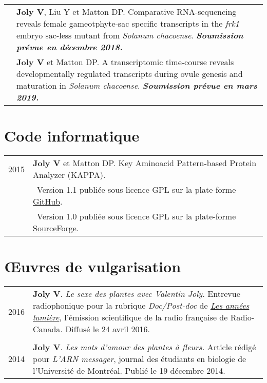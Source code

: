 \documentclass[letterpaper,12pt]{article}
\begin{document}
\begin{tabularx}{\textwidth}{@{}r|X@{}}
& \textbf{Joly V}, Liu Y et Matton DP.
  Comparative RNA-sequencing reveals female gameotphyte-sac specific transcripts in the \emph{frk1} embryo sac-less mutant from \emph{Solanum chacoense}. {\bfseries\em Soumission prévue en décembre 2018.} \vspace{3mm} \\

& \textbf{Joly V} et Matton DP.
  A transcriptomic time-course reveals developmentally regulated transcripts during ovule genesis and maturation in \emph{Solanum chacoense}. {\bfseries\em Soumission prévue en mars 2019.} \\
\end{tabularx}

\vspace{6mm}

\section[Code informatique]{Code informatique}

\begin{tabularx}{\textwidth}{@{}r|X@{}}

2015 & \textbf{Joly V} et Matton DP. Key Aminoacid Pattern-based Protein Analyzer (KAPPA). \\
& \small \hspace{1.5mm} \textbullet{}~Version 1.1 publiée sous licence GPL sur la plate-forme \href{https://github.com/valentinjoly/kappa-1.1}{GitHub}. \\
& \small \hspace{1.5mm} \textbullet{}~Version 1.0 publiée sous licence GPL sur la plate-forme \href{https://sourceforge.net/projects/kappa-sequence-search/}{SourceForge}. \\

\end{tabularx}

\vspace{6mm}

\section[Vulgarisation]{Œuvres de vulgarisation}

\begin{tabularx}{\textwidth}{@{}r|X@{}}

2016 & \textbf{Joly V}. {\em Le sexe des plantes avec Valentin Joly.} Entrevue radiophonique pour la rubrique {\em Doc/Post-doc} de \href{http://ici.radio-canada.ca/emissions/les_annees_lumiere/2015-2016/chronique.asp?idChronique=404672}{\em Les années lumière}, l’émission scientifique de la radio française de Radio-Canada. Diffusé le 24 avril 2016. \\

\multicolumn{2}{c}{} \\

2014 & \textbf{Joly V}. {\em Les mots d’amour des plantes à fleurs.} Article rédigé pour {\em L’ARN messager}, journal des étudiants en biologie de l’Université de Montréal. Publié le 19 décembre 2014. \\

\end{tabularx}
\end{document}
